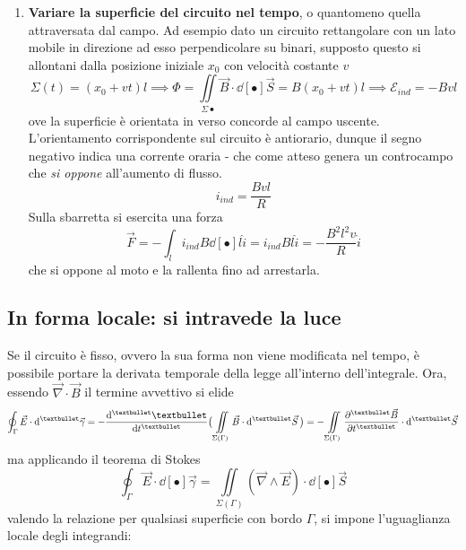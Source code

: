 \begin{enumerate}
\item \textbf{Variare la superficie del circuito nel tempo}, o quantomeno quella attraversata dal campo. Ad esempio dato un circuito rettangolare con un lato mobile in direzione ad esso perpendicolare su binari, supposto questo si allontani dalla posizione iniziale $x_0$ con velocità costante $v$
\[\Sigma(t) = (x_0 + vt) l \implies \Phi = \iint\limits_{\Sigma •} \vec{B} \cdot \dd[•]{\vec{S}} = B (x_0 + vt) l \implies \mathcal{E}_{ind} = - B v l\]
ove la superficie è orientata in verso concorde al campo uscente. L'orientamento corrispondente sul circuito è antiorario, dunque il segno negativo indica una corrente oraria - che come atteso genera un controcampo che \textit{si oppone} all'aumento di flusso.
\[i_{ind} = \frac{Bvl}{R}\]
Sulla sbarretta si esercita una forza
\[\vec{F} = - \int_l i_{ind} B \dd[•]{l} \hat{i} = i_{ind} B l \hat{i} = - \frac{B^2 l^2 v}{R} \hat{i}\]
che si oppone al moto e la rallenta fino ad arrestarla.
\end{enumerate}


\subsection{In forma locale: si intravede la luce}
Se il circuito è fisso, ovvero la sua forma non viene modificata nel tempo, è possibile portare la derivata temporale della legge all'interno dell'integrale. Ora, essendo $\vec{\nabla} \cdot \vec{B}$ il termine avvettivo si elide
\[\oint_\Gamma \vec{E} \cdot \dd[•]{\vec{\gamma}} = - \dv[•]{•}{t} \big(\iint\limits_{\Sigma(\Gamma)} \vec{B} \cdot \dd[•]{\vec{S}}\big) = - \iint\limits_{\Sigma (\Gamma)} \pdv[•]{\vec{B}}{t} \cdot \dd[•]{\vec{S}}\]
ma applicando il teorema di Stokes
\[\oint_\Gamma \vec{E} \cdot \dd[•]{\vec{\gamma}} = \iint\limits_{\Sigma (\Gamma)} (\vec{\nabla} \wedge \vec{E}) \cdot \dd[•]{\vec{S}}\]
valendo la relazione per qualsiasi superficie con bordo $\Gamma$, si impone l'uguaglianza locale degli integrandi:

